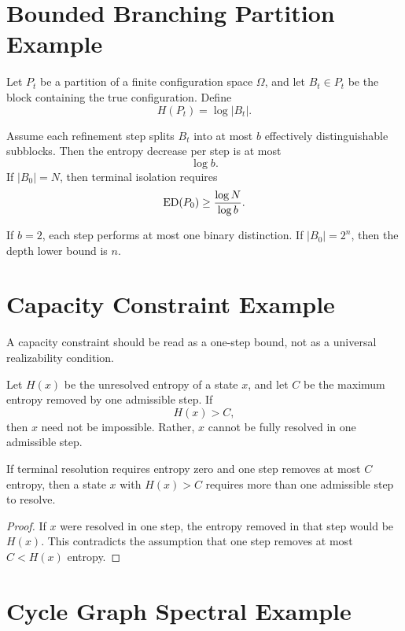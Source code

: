 \section{Bounded Branching Partition Example}

Let \(P_t\) be a partition of a finite configuration space \(\Omega\), and let
\(B_t\in P_t\) be the block containing the true configuration. Define
\[
H(P_t)=\log |B_t|.
\]

Assume each refinement step splits \(B_t\) into at most \(b\) effectively
distinguishable subblocks. Then the entropy decrease per step is at most
\[
\log b.
\]
If \(|B_0|=N\), then terminal isolation requires
\[
\mathrm{ED}(P_0)\ge \frac{\log N}{\log b}.
\]

\begin{example}
If \(b=2\), each step performs at most one binary distinction. If
\(|B_0|=2^n\), then the depth lower bound is \(n\).
\end{example}

\section{Capacity Constraint Example}

A capacity constraint should be read as a one-step bound, not as a universal
realizability condition.

Let \(H(x)\) be the unresolved entropy of a state \(x\), and let \(C\) be the
maximum entropy removed by one admissible step. If
\[
H(x)>C,
\]
then \(x\) need not be impossible. Rather, \(x\) cannot be fully resolved in
one admissible step.

\begin{theorem}
If terminal resolution requires entropy zero and one step removes at most
\(C\) entropy, then a state \(x\) with \(H(x)>C\) requires more than one
admissible step to resolve.
\end{theorem}

\begin{proof}
If \(x\) were resolved in one step, the entropy removed in that step would be
\(H(x)\). This contradicts the assumption that one step removes at most
\(C<H(x)\) entropy.
\end{proof}

\section{Cycle Graph Spectral Example}

